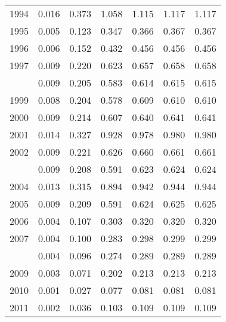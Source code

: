 \documentclass[
]{article}
\begin{document}
\begin{longtable}[t]{lrrrrrr}
1994 & 0.016 & 0.373 & 1.058 & 1.115 & 1.117 & 1.117\\
1995 & 0.005 & 0.123 & 0.347 & 0.366 & 0.367 & 0.367\\
1996 & 0.006 & 0.152 & 0.432 & 0.456 & 0.456 & 0.456\\
1997 & 0.009 & 0.220 & 0.623 & 0.657 & 0.658 & 0.658\\
\addlinespace
1998 & 0.009 & 0.205 & 0.583 & 0.614 & 0.615 & 0.615\\
1999 & 0.008 & 0.204 & 0.578 & 0.609 & 0.610 & 0.610\\
2000 & 0.009 & 0.214 & 0.607 & 0.640 & 0.641 & 0.641\\
2001 & 0.014 & 0.327 & 0.928 & 0.978 & 0.980 & 0.980\\
2002 & 0.009 & 0.221 & 0.626 & 0.660 & 0.661 & 0.661\\
\addlinespace
2003 & 0.009 & 0.208 & 0.591 & 0.623 & 0.624 & 0.624\\
2004 & 0.013 & 0.315 & 0.894 & 0.942 & 0.944 & 0.944\\
2005 & 0.009 & 0.209 & 0.591 & 0.624 & 0.625 & 0.625\\
2006 & 0.004 & 0.107 & 0.303 & 0.320 & 0.320 & 0.320\\
2007 & 0.004 & 0.100 & 0.283 & 0.298 & 0.299 & 0.299\\
\addlinespace
2008 & 0.004 & 0.096 & 0.274 & 0.289 & 0.289 & 0.289\\
2009 & 0.003 & 0.071 & 0.202 & 0.213 & 0.213 & 0.213\\
2010 & 0.001 & 0.027 & 0.077 & 0.081 & 0.081 & 0.081\\
2011 & 0.002 & 0.036 & 0.103 & 0.109 & 0.109 & 0.109\\*
\end{longtable}
\end{document}
